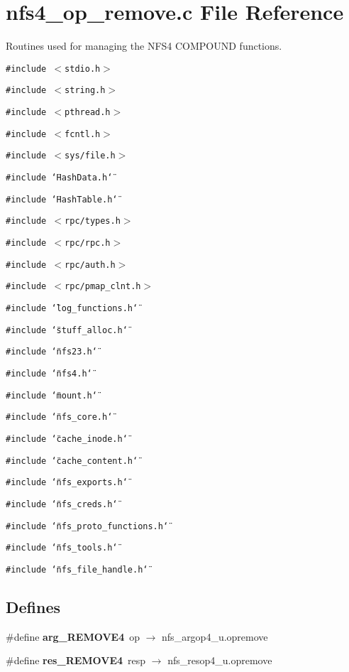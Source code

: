 \section{nfs4\_\-op\_\-remove.c File Reference}
\label{nfs4__op__remove_8c}
Routines used for managing the NFS4 COMPOUND functions. 

{\tt \#include $<$stdio.h$>$}\par
{\tt \#include $<$string.h$>$}\par
{\tt \#include $<$pthread.h$>$}\par
{\tt \#include $<$fcntl.h$>$}\par
{\tt \#include $<$sys/file.h$>$}\par
{\tt \#include \char`\"{}Hash\-Data.h\char`\"{}}\par
{\tt \#include \char`\"{}Hash\-Table.h\char`\"{}}\par
{\tt \#include $<$rpc/types.h$>$}\par
{\tt \#include $<$rpc/rpc.h$>$}\par
{\tt \#include $<$rpc/auth.h$>$}\par
{\tt \#include $<$rpc/pmap\_\-clnt.h$>$}\par
{\tt \#include \char`\"{}log\_\-functions.h\char`\"{}}\par
{\tt \#include \char`\"{}stuff\_\-alloc.h\char`\"{}}\par
{\tt \#include \char`\"{}nfs23.h\char`\"{}}\par
{\tt \#include \char`\"{}nfs4.h\char`\"{}}\par
{\tt \#include \char`\"{}mount.h\char`\"{}}\par
{\tt \#include \char`\"{}nfs\_\-core.h\char`\"{}}\par
{\tt \#include \char`\"{}cache\_\-inode.h\char`\"{}}\par
{\tt \#include \char`\"{}cache\_\-content.h\char`\"{}}\par
{\tt \#include \char`\"{}nfs\_\-exports.h\char`\"{}}\par
{\tt \#include \char`\"{}nfs\_\-creds.h\char`\"{}}\par
{\tt \#include \char`\"{}nfs\_\-proto\_\-functions.h\char`\"{}}\par
{\tt \#include \char`\"{}nfs\_\-tools.h\char`\"{}}\par
{\tt \#include \char`\"{}nfs\_\-file\_\-handle.h\char`\"{}}\par
\subsection*{Defines}
\begin{CompactItemize}
\item 
\#define {\bf arg\_\-REMOVE4}\ op $\rightarrow$ nfs\_\-argop4\_\-u.opremove
\item 
\#define {\bf res\_\-REMOVE4}\ resp $\rightarrow$ nfs\_\-resop4\_\-u.opremove
\end{CompactItemize}

